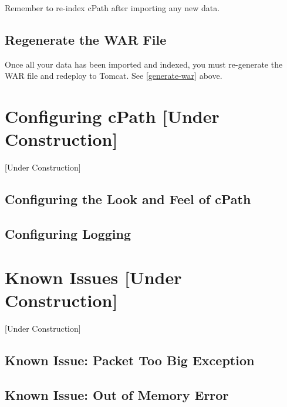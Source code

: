 \documentclass[letterpaper,12pt]{article}
\begin{document}
Remember to re-index cPath after importing any new data.

\subsection{Regenerate the WAR File}

Once all your data has been imported and indexed, you must re-generate the WAR file and redeploy to Tomcat.  See \ref{generate-war} above.

\section{Configuring cPath [Under Construction]}

[Under Construction]

\subsection{Configuring the Look and Feel of cPath}


\subsection{Configuring Logging}

\section{Known Issues [Under Construction]}

[Under Construction]
\subsection{Known Issue: Packet Too Big Exception}
\subsection{Known Issue: Out of Memory Error}
\end{document}
